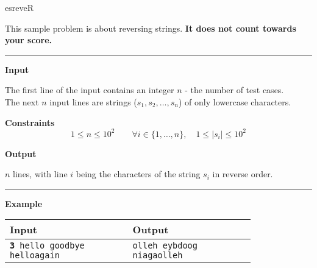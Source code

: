 \togglefalse{IsScore}
{esreveR}

This sample problem is about reversing strings. \textbf{It does not count towards your score.}

\vspace{8pt}
\hrule

\textbf{Input}

The first line of the input contains an integer $n$ - the number of test cases. \\ 
The next $n$ input lines are strings ($s_1, s_2, \dots, s_n$) of only lowercase characters.

\textbf{Constraints}
\begin{equation*}
    1 \leq n \leq 10^2 \qquad 
    \forall i \in \{1, \dots, n\}, \quad 1 \leq |s_i| \leq 10^2
\end{equation*}

\textbf{Output}

$n$ lines, with line $i$ being the characters of the string $s_i$ in reverse order.

\vspace{8pt}
\hrule

\textbf{Example}

\begin{table}[h]
    \centering
    \begin{tabular}{|p{0.4\linewidth}|p{0.4\linewidth}|}
        \hline
        Input & Output \\
        \hline
        \texttt{\textbf{3}\newline 
        hello\newline 
        goodbye\newline 
        helloagain} & 
        \texttt{olleh\newline
        eybdoog\newline
        niagaolleh} \\
        \hline
    \end{tabular}
\end{table}